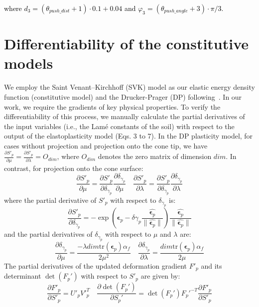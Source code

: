 \documentclass[letterpaper, 10 pt, journal, twoside]{ieeetran}
\newcommand{\rp}[1]{\textcolor{black}{#1}}
\begin{document}
\noindent\rp{where $d_3=(\theta_{push\_dist}+1)\cdot0.1+0.04$ and $\varphi_3=(\theta_{push\_angle}+3)\cdot\pi/3$.}

\section{Differentiability of the constitutive models}
We employ the Saint Venant–Kirchhoff (SVK) model as our elastic energy density function (constitutive model) and the Drucker-Prager (DP) following~\cite{klar2016drucker}. In our work, we require the gradients of key physical properties. To verify the differentiability of this process, we manually calculate the partial derivatives of the input variables (i.e., the Lam\'e constants of the soil) with respect to the output of the elastoplasticity model (Eqs. 3 to 7). In the DP plasticity model, for cases without projection and projection onto the cone tip, we have $\frac{\partial S'_p}{\partial \mu} = \frac{\partial S'_p}{\partial \lambda} = O_{dim}$, where $O_{dim}$ denotes the zero matrix of dimension $dim$. In contrast, for projection onto the cone surface:
\begin{equation}
\frac{\partial S'_p}{\partial \mu} = \frac{\partial S'_p}{\partial \delta_{\gamma_{p}}}\frac{\partial \delta_{\gamma_{p}}}{\partial \mu} \quad \frac{\partial S'_p}{\partial \lambda} = \frac{\partial S'_p}{\partial \delta_{\gamma_{p}}}\frac{\partial \delta_{\gamma_{p}}}{\partial \lambda}
\end{equation}
where the partial derivative of $S'_p$ with respect to $\delta_{\gamma_{p}}$ is:
\begin{equation}
\frac{\partial S'_p}{\partial \delta_{\gamma_{p}}} = -\exp(\pmb{\epsilon}_p-\delta \gamma_{p}\frac{\hat{\pmb{\epsilon}_p}}{\|\hat{\pmb{\epsilon}_p}\|}) \frac{\hat{\pmb{\epsilon}_p}}{\|\hat{\pmb{\epsilon}_p}\|}
\end{equation}
and the partial derivatives of $\delta_{\gamma_{p}}$ with respect to $\mu$ and $\lambda$ are:
\begin{equation}
\frac{\partial \delta_{\gamma_{p}}}{\partial \mu} = \frac{- \lambda dim \mathrm{tr}(\pmb{\epsilon}_p)\alpha_f}{2\mu^{2}} \quad \frac{\partial \delta_{\gamma_{p}}}{\partial \lambda} = \frac{dim \mathrm{tr}(\pmb{\epsilon}_p)\alpha_f}{2\mu}
\end{equation}
The partial derivatives of the updated deformation gradient $F'_p$ and its determinant $\det(F_p')$ with respect to $S'_p$ are given by:
\begin{equation}
\frac{\partial F'_p}{\partial S'_p} = U'_p V'^{T}_p \quad \frac{\partial \det(F_p')}{\partial S_p'} =
\det(F_p') F_p'^{-T} \frac{\partial F'_p}{\partial S'_p}
\end{equation}
\end{document}
